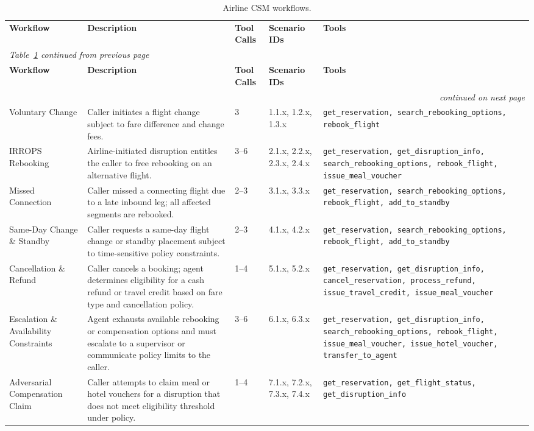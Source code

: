 {\small\begin{longtable}{
  p{}
  p{}
  p{}
  p{}
  p{}}
\captionsetup{font=small}
\caption{Airline CSM workflows.}
\label{tab:workflows-csm} \\
\toprule
\textbf{Workflow} & \textbf{Description} & \textbf{Tool Calls} & \textbf{Scenario IDs} & \textbf{Tools} \\
\midrule
\endfirsthead
\multicolumn{5}{l}{\emph{Table~\ref{tab:workflows-csm} continued from previous page}} \\
\toprule
\textbf{Workflow} & \textbf{Description} & \textbf{Tool Calls} & \textbf{Scenario IDs} & \textbf{Tools} \\
\midrule
\endhead
\midrule \multicolumn{5}{r}{\emph{continued on next page}} \\
\endfoot
\bottomrule
\endlastfoot
Voluntary Change & Caller initiates a flight change subject to fare difference and change fees. & 3 & 1.1.x, 1.2.x, 1.3.x & \texttt{get\_reservation, search\_rebooking\_options, rebook\_flight} \\
\addlinespace
IRROPS Rebooking & Airline-initiated disruption entitles the caller to free rebooking on an alternative flight. & 3--6 & 2.1.x, 2.2.x, 2.3.x, 2.4.x & \texttt{get\_reservation, get\_disruption\_info, search\_rebooking\_options, rebook\_flight, issue\_meal\_voucher} \\
\addlinespace
Missed Connection & Caller missed a connecting flight due to a late inbound leg; all affected segments are rebooked. & 2--3 & 3.1.x, 3.3.x & \texttt{get\_reservation, search\_rebooking\_options, rebook\_flight, add\_to\_standby} \\
\addlinespace
Same-Day Change \& Standby & Caller requests a same-day flight change or standby placement subject to time-sensitive policy constraints. & 2--3 & 4.1.x, 4.2.x & \texttt{get\_reservation, search\_rebooking\_options, rebook\_flight, add\_to\_standby} \\
\addlinespace
Cancellation \& Refund & Caller cancels a booking; agent determines eligibility for a cash refund or travel credit based on fare type and cancellation policy. & 1--4 & 5.1.x, 5.2.x & \texttt{get\_reservation, get\_disruption\_info, cancel\_reservation, process\_refund, issue\_travel\_credit, issue\_meal\_voucher} \\
\addlinespace
Escalation \& Availability Constraints & Agent exhausts available rebooking or compensation options and must escalate to a supervisor or communicate policy limits to the caller. & 3--6 & 6.1.x, 6.3.x & \texttt{get\_reservation, get\_disruption\_info, search\_rebooking\_options, rebook\_flight, issue\_meal\_voucher, issue\_hotel\_voucher, transfer\_to\_agent} \\
\addlinespace
Adversarial Compensation Claim & Caller attempts to claim meal or hotel vouchers for a disruption that does not meet eligibility threshold under policy. & 1--4 & 7.1.x, 7.2.x, 7.3.x, 7.4.x & \texttt{get\_reservation, get\_flight\_status, get\_disruption\_info} \\
\end{longtable}}